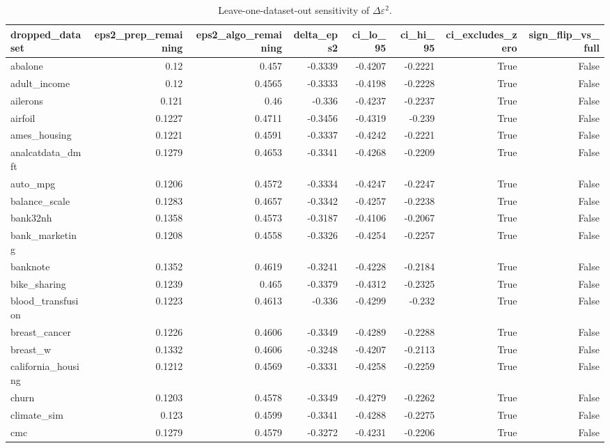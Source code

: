 \begin{table}
\caption{Leave-one-dataset-out sensitivity of $\Delta\varepsilon^2$.}
\label{tab:loo_sensitivity}
\begin{tabular}{lrrrrrrr}
\toprule
dropped\_dataset & eps2\_prep\_remaining & eps2\_algo\_remaining & delta\_eps2 & ci\_lo\_95 & ci\_hi\_95 & ci\_excludes\_zero & sign\_flip\_vs\_full \\
\midrule
abalone & 0.12 & 0.457 & -0.3339 & -0.4207 & -0.2221 & True & False \\
adult\_income & 0.12 & 0.4565 & -0.3333 & -0.4198 & -0.2228 & True & False \\
ailerons & 0.121 & 0.46 & -0.336 & -0.4237 & -0.2237 & True & False \\
airfoil & 0.1227 & 0.4711 & -0.3456 & -0.4319 & -0.239 & True & False \\
ames\_housing & 0.1221 & 0.4591 & -0.3337 & -0.4242 & -0.2221 & True & False \\
analcatdata\_dmft & 0.1279 & 0.4653 & -0.3341 & -0.4268 & -0.2209 & True & False \\
auto\_mpg & 0.1206 & 0.4572 & -0.3334 & -0.4247 & -0.2247 & True & False \\
balance\_scale & 0.1283 & 0.4657 & -0.3342 & -0.4257 & -0.2238 & True & False \\
bank32nh & 0.1358 & 0.4573 & -0.3187 & -0.4106 & -0.2067 & True & False \\
bank\_marketing & 0.1208 & 0.4558 & -0.3326 & -0.4254 & -0.2257 & True & False \\
banknote & 0.1352 & 0.4619 & -0.3241 & -0.4228 & -0.2184 & True & False \\
bike\_sharing & 0.1239 & 0.465 & -0.3379 & -0.4312 & -0.2325 & True & False \\
blood\_transfusion & 0.1223 & 0.4613 & -0.336 & -0.4299 & -0.232 & True & False \\
breast\_cancer & 0.1226 & 0.4606 & -0.3349 & -0.4289 & -0.2288 & True & False \\
breast\_w & 0.1332 & 0.4606 & -0.3248 & -0.4207 & -0.2113 & True & False \\
california\_housing & 0.1212 & 0.4569 & -0.3331 & -0.4258 & -0.2259 & True & False \\
churn & 0.1203 & 0.4578 & -0.3349 & -0.4279 & -0.2262 & True & False \\
climate\_sim & 0.123 & 0.4599 & -0.3341 & -0.4288 & -0.2275 & True & False \\
cmc & 0.1279 & 0.4579 & -0.3272 & -0.4231 & -0.2206 & True & False \\

\end{tabular}
\end{table}
